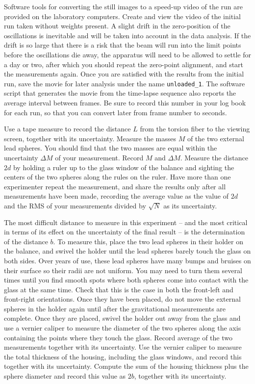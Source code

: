 \documentclass{revtex4}
\begin{document}
Software tools for converting the still images to a speed-up video of the
run are provided on the laboratory computers.  Create and view the video
of the initial run taken without weights present.  A slight drift in the
zero-position of the oscillations is inevitable and will be taken into account
in the data analysis.  If the drift is so large that there is a risk that
the beam will run into the limit points before the oscillations die away,
the apparatus will need to be allowed to settle for a day or two, after which
you should repeat the zero-point alignment, and start the measurements again.
Once you are satisfied with the results from the initial run, save the
movie for later analysis under the name {\tt unloaded\_1}.  The software
script that generates the movie from the time-lapse sequence also reports the
average interval between frames.  Be sure to record this number in your
log book for each run, so that you can convert later from frame number to
seconds.

Use a tape measure to record the distance $L$ from the torsion fiber to the
viewing screen, together with its uncertainty.  Measure the masses $M$ of
the two external lead spheres.  You should find that the two masses are equal
within the uncertainty $\Delta M$ of your measurement.  Record $M$ and
$\Delta M$.  Measure the distance $2d$ by holding a ruler up to the glass
window of the balance and sighting the centers of the two spheres along the
rules on the ruler.  Have more than one experimenter repeat the measurement,
and share the results only after all measurements have been made, recording
the average value as the value of $2d$ and the RMS of your measurements 
divided by $\sqrt{N}$ as its uncertainty.

The most difficult distance to measure in this experiment --
and the most critical in terms of its effect on the uncertainty of the 
final result -- is the determination of the distance $b$.  To measure this,
place the two lead spheres in their holder on the balance, and swivel the
holder until the lead spheres barely touch the glass on both sides.  Over
years of use, these lead spheres have many bumps and bruises on their surface
so their radii are not uniform.  You may need to turn them several times
until you find smooth spots where both spheres come into contact with the
glass at the same time.  Check that this is the case in both the front-left
and front-right orientations.  Once they have been placed, do not move the
external spheres in the holder again until after the gravitational
measurements are complete.  Once they are placed, swivel the holder out away
from the glass and use a vernier caliper to measure the diameter of the two
spheres along the axis containing the points where they touch the glass.
Record average of the two measurements together with its
uncertainty.  Use the vernier caliper to measure the total thickness of the
housing, including the glass windows, and record this together with its
uncertainty.  Compute the sum of the housing thickness plus the sphere
diameter and record this value as $2b$, together with its uncertainty.
\end{document}

